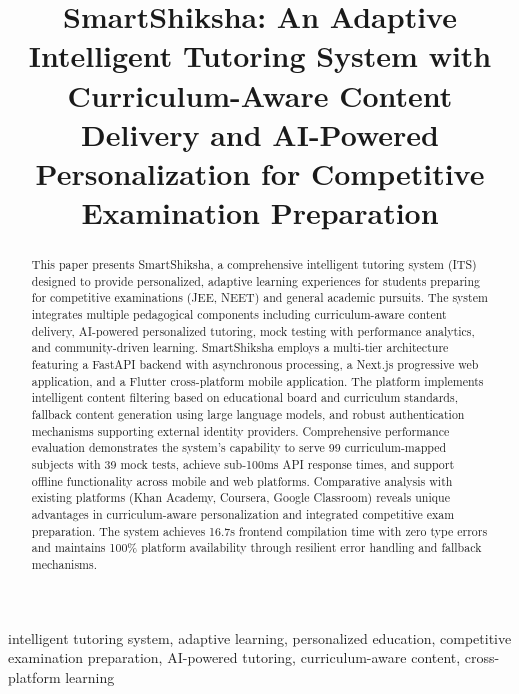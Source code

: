 \documentclass[10pt,conference,compsocconf]{IEEEtran}
\begin{document}
\title{SmartShiksha: An Adaptive Intelligent Tutoring System with Curriculum-Aware Content Delivery and AI-Powered Personalization for Competitive Examination Preparation}

\author{
}

\maketitle

\begin{abstract}
This paper presents SmartShiksha, a comprehensive intelligent tutoring system (ITS) designed to provide personalized, adaptive learning experiences for students preparing for competitive examinations (JEE, NEET) and general academic pursuits. The system integrates multiple pedagogical components including curriculum-aware content delivery, AI-powered personalized tutoring, mock testing with performance analytics, and community-driven learning. SmartShiksha employs a multi-tier architecture featuring a FastAPI backend with asynchronous processing, a Next.js progressive web application, and a Flutter cross-platform mobile application. The platform implements intelligent content filtering based on educational board and curriculum standards, fallback content generation using large language models, and robust authentication mechanisms supporting external identity providers. Comprehensive performance evaluation demonstrates the system's capability to serve 99 curriculum-mapped subjects with 39 mock tests, achieve sub-100ms API response times, and support offline functionality across mobile and web platforms. Comparative analysis with existing platforms (Khan Academy, Coursera, Google Classroom) reveals unique advantages in curriculum-aware personalization and integrated competitive exam preparation. The system achieves 16.7s frontend compilation time with zero type errors and maintains 100\% platform availability through resilient error handling and fallback mechanisms.
\end{abstract}

\begin{IEEEkeywords}
intelligent tutoring system, adaptive learning, personalized education, competitive examination preparation, AI-powered tutoring, curriculum-aware content, cross-platform learning
\end{IEEEkeywords}
\end{document}
